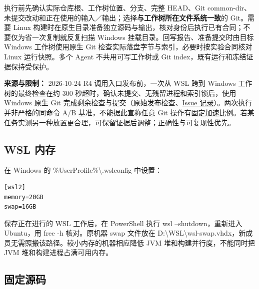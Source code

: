 执行前先确认实际仓库根、工作树位置、分支、完整 HEAD、Git common-dir、未提交改动和正在使用的输入／输出；选择\textbf{与工作树所在文件系统一致}的 Git。需要 Linux 构建时在原生目录准备独立源码与输出，核对身份后执行已有合同；不要仅为省一次复制就反复扫描 Windows 挂载目录。回写报告、准备提交时由目标 Windows 工作树使用原生 Git 检查实际落盘字节与索引，必要时按实验合同核对 Linux 运行快照。多个 Agent 不共用可写工作树或 Git index，既有运行和冻结证据保持受保护。\par


\textbf{来源与限制：} 2026-10-24 R4 调用入口发布前，一次从 WSL 跨到 Windows 工作树的最终检查在约 300 秒超时，确认未提交、无残留进程和索引锁后，使用 Windows 原生 Git 完成剩余检查与提交（原始发布检查、\href{https://github.com/cc77-builder/riscv/issues/2\#issuecomment-6376672788}{Issue 记录}）。两次执行并非严格的同命令 A/B 基准，不能据此宣称任意 Git 操作有固定加速比例。若某任务实测另一种放置更合理，可保留证据后调整；正确性与可复现性优先。\par


\subsection{WSL 内存}


在 Windows 的 \%UserProfile\%\textbackslash{}.wslconfig 中设置：\par


\begin{Verbatim}[breaklines,breakanywhere,breaksymbolleft={},breaksymbolright={},fontsize=\footnotesize,baselinestretch=1]
[wsl2]
memory=20GB
swap=16GB
\end{Verbatim}


保存正在进行的 WSL 工作后，在 PowerShell 执行 wsl --shutdown，重新进入 Ubuntu，用 free -h 核对。原机器 swap 文件放在 D:\textbackslash{}WSL\textbackslash{}wsl-swap.vhdx，新成员无需照搬该路径。较小内存的机器相应降低 JVM 堆和构建并行度，不能同时把 JVM 堆和构建进程占满可用内存。\par


\subsection{固定源码}


